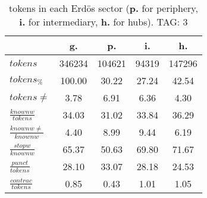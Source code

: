 \begin{table}[h!]
\begin{center}
\begin{tabular}{| l || c | c | c | c |}\hline
 & {\bf g.} & {\bf p.} & {\bf i.} & {\bf h.} \\\hline\hline
$tokens$ & 346234  & 104621  & 94319  & 147296 \\
$tokens_{\%}$ & 100.00  & 30.22  & 27.24  & 42.54 \\
$tokens \neq$ & 3.78  & 6.91  & 6.36  & 4.30 \\\hline
$\frac{knownw}{tokens}$ & 34.03  & 31.02  & 33.84  & 36.29 \\
$\frac{knownw \neq}{knownw}$ & 4.40  & 8.99  & 9.44  & 6.19 \\\hline
$\frac{stopw}{knownw}$ & 65.37  & 50.63  & 69.80  & 71.67 \\
$\frac{punct}{tokens}$ & 28.10  & 33.07  & 28.18  & 24.53 \\
$\frac{contrac}{tokens}$ & 0.85  & 0.43  & 1.01  & 1.05 \\\hline
\end{tabular}
\caption{tokens in each Erd\"os sector ({{\bf p.}} for periphery, {{\bf i.}} for intermediary, 
    {{\bf h.}} for hubs). TAG: 3}
\end{center}
\end{table}